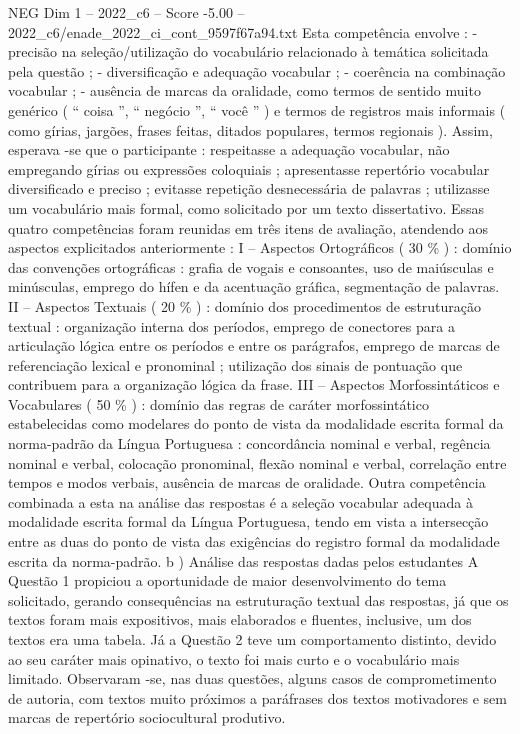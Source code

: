 \begin{textsample}{NEG Dim 1 – 2022\_c6 – Score -5.00 – 2022\_c6/enade\_2022\_ci\_cont\_9597f67a94.txt}
Esta competência envolve : - precisão na seleção/utilização do vocabulário relacionado à temática solicitada pela questão ; - diversificação e adequação vocabular ; - coerência na combinação vocabular ; - ausência de marcas da oralidade, como termos de sentido muito genérico ( “ coisa ”, “ negócio ”, “ você ” ) e termos de registros mais informais ( como gírias, jargões, frases feitas, ditados populares, termos regionais ).
Assim, esperava -se que o participante : respeitasse a adequação vocabular, não empregando gírias ou expressões coloquiais ; apresentasse repertório vocabular diversificado e preciso ; evitasse repetição desnecessária de palavras ; utilizasse um vocabulário mais formal, como solicitado por um texto dissertativo.
Essas quatro competências foram reunidas em três itens de avaliação, atendendo aos aspectos explicitados anteriormente : I – Aspectos Ortográficos ( 30 \% ) : domínio das convenções ortográficas : grafia de vogais e consoantes, uso de maiúsculas e minúsculas, emprego do hífen e da acentuação gráfica, segmentação de palavras.
II – Aspectos Textuais ( 20 \% ) : domínio dos procedimentos de estruturação textual : organização interna dos períodos, emprego de conectores para a articulação lógica entre os períodos e entre os parágrafos, emprego de marcas de referenciação lexical e pronominal ; utilização dos sinais de pontuação que contribuem para a organização lógica da frase.
III – Aspectos Morfossintáticos e Vocabulares ( 50 \% ) : domínio das regras de caráter morfossintático estabelecidas como modelares do ponto de vista da modalidade escrita formal da norma-padrão da Língua Portuguesa : concordância nominal e verbal, regência nominal e verbal, colocação pronominal, flexão nominal e verbal, correlação entre tempos e modos verbais, ausência de marcas de oralidade.
Outra competência combinada a esta na análise das respostas é a seleção vocabular adequada à modalidade escrita formal da Língua Portuguesa, tendo em vista a intersecção entre as duas do ponto de vista das exigências do registro formal da modalidade escrita da norma-padrão. b ) Análise das respostas dadas pelos estudantes A Questão 1 propiciou a oportunidade de maior desenvolvimento do tema solicitado, gerando consequências na estruturação textual das respostas, já que os textos foram mais expositivos, mais elaborados e fluentes, inclusive, um dos textos era uma tabela.
Já a Questão 2 teve um comportamento distinto, devido ao seu caráter mais opinativo, o texto foi mais curto e o vocabulário mais limitado.
Observaram -se, nas duas questões, alguns casos de comprometimento de autoria, com textos muito próximos a paráfrases dos textos motivadores e sem marcas de repertório sociocultural produtivo.

\end{textsample}
